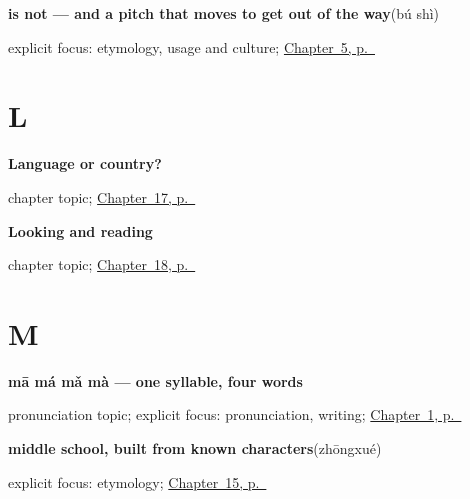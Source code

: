 \noindent\begin{minipage}[t]{\linewidth}
\raggedright
\textbf{is not — and a pitch that moves to get out of the way}\enspace\emph{}\enspace(bú shì)\par
\footnotesize explicit focus: etymology, usage and culture; \hyperref[ch:zh-shi]{Chapter~5, p.~\pageref*{ch:zh-shi}}
\end{minipage}\par\smallskip

\section*{L}

\noindent\begin{minipage}[t]{\linewidth}
\raggedright
\textbf{Language or country?}\par
\footnotesize chapter topic; \hyperref[ch:zh-language-country]{Chapter~17, p.~\pageref*{ch:zh-language-country}}
\end{minipage}\par\smallskip

\noindent\begin{minipage}[t]{\linewidth}
\raggedright
\textbf{Looking and reading}\par
\footnotesize chapter topic; \hyperref[ch:zh-looking-reading]{Chapter~18, p.~\pageref*{ch:zh-looking-reading}}
\end{minipage}\par\smallskip

\section*{M}

\noindent\begin{minipage}[t]{\linewidth}
\raggedright
\textbf{mā má mǎ mà — one syllable, four words}\par
\footnotesize pronunciation topic; explicit focus: pronunciation, writing; \hyperref[ch:zh-nihao]{Chapter~1, p.~\pageref*{ch:zh-nihao}}
\end{minipage}\par\smallskip

\noindent\begin{minipage}[t]{\linewidth}
\raggedright
\textbf{middle school, built from known characters}\enspace\emph{}\enspace(zhōngxué)\par
\footnotesize explicit focus: etymology; \hyperref[ch:zh-school-compounds]{Chapter~15, p.~\pageref*{ch:zh-school-compounds}}
\end{minipage}\par\smallskip

